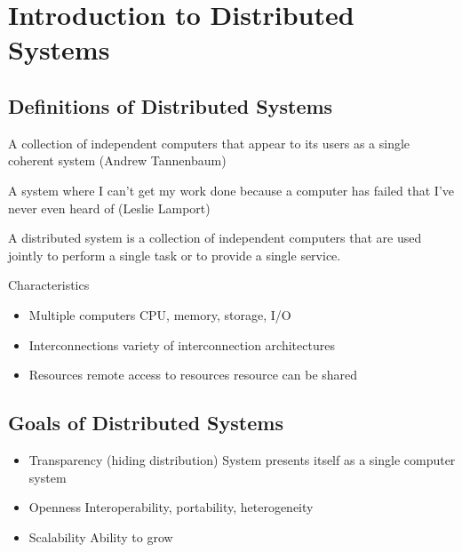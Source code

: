 \section{Introduction to Distributed Systems}

\subsection{Definitions of Distributed Systems}
\begin{leftbar}
	A collection of independent computers that appear to its users as a single coherent system (Andrew Tannenbaum)
\end{leftbar}
\begin{leftbar}
	A system where I can't get my work done because a computer has failed that I've never even heard of (Leslie Lamport)
\end{leftbar}
A distributed system is a collection of independent computers that are used jointly to perform a single task or to provide a single service.

\begin{note}{Characteristics}
	\begin{itemize}
		\item Multiple computers
		\subitem CPU, memory, storage, I/O
		\item Interconnections
		\subitem variety of interconnection architectures
		\item Resources
		\subitem remote access to resources
		\subitem resource can be shared
	\end{itemize}
\end{note}

\subsection{Goals of Distributed Systems}
\begin{itemize}
	\item Transparency (hiding distribution)
	\subitem System presents itself as a single computer system
	\item Openness
	\subitem Interoperability, portability, heterogeneity
	\item Scalability
	\subitem Ability to grow
\end{itemize}

